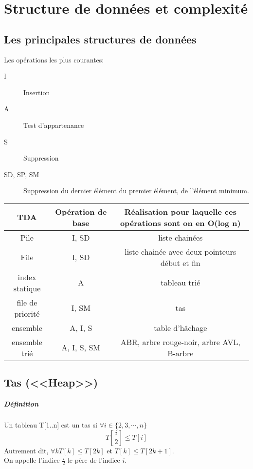 \chapter{Structure de données et complexité}
\section{Les principales structures de données}
Les opérations les plus courantes: 
\begin{description}
	\item[I]Insertion
	\item[A] Test d'appartenance
	\item[S] Suppression
	\item[SD, SP, SM] Suppression du dernier élément du premier élément, de l'élément minimum.
\end{description}

\begin{tabular}{|c|c|c}
	\textbf{TDA}\footnotemark & \textbf{Opération de base} & \textbf{Réalisation pour laquelle ces opérations sont on en O(log n)}\\
	\hline
	Pile & I, SD & liste chainées\\
	\hline
	File & I, SD & liste chainée avec deux pointeurs début et fin\\
	\hline
	index statique & A & tableau trié\\
	\hline
	file de priorité & I, SM & tas\\
	\hline
	ensemble & A, I, S & table d'hâchage\footnotemark\\
	\hline
	ensemble trié & A, I, S, SM & ABR, arbre rouge-noir, arbre AVL, B-arbre\footnotemark\\
\end{tabular} 


\section{Tas (<<Heap>>)}
\paragraph{Définition} Un tableau T[1..n] est un tas si $\forall i \in \{2,3,\cdots,n\}$ $$T[\frac{i}{2}] \leq T[i]$$
Autrement dit, $\forall k T[k] \leq T[2k]$ et $T[k] \leq T[2k+1]$.\\
On appelle l'indice $\frac{i}{2}$ le père de l'indice $i$.

